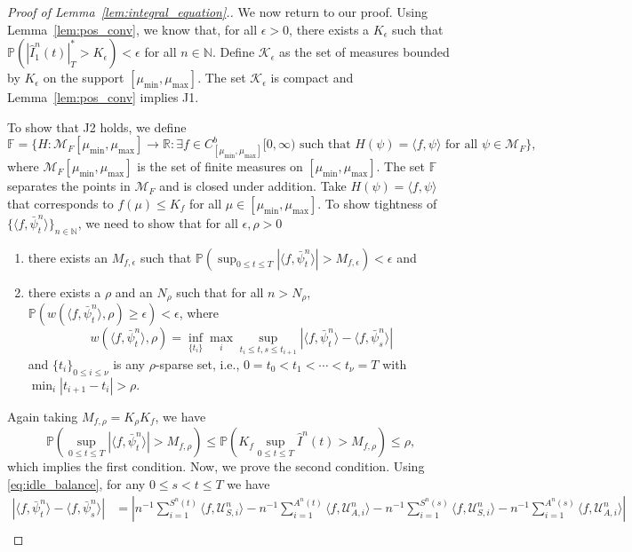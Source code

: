 \documentclass[a4paper,11pt,twoside]{article}
\numberwithin{equation}{section}
\numberwithin{figure}{section}
\theoremstyle{plain}
\newcommand{\cK}{\mathcal{K}}
\newcommand{\cM}{\mathcal{M}}
\newcommand{\cU}{\mathcal{U}}
\newcommand{\FF}{\mathbb{F}}
\newcommand{\NN}{\mathbb{N}}
\newcommand{\PP}{\mathbb{P}}
\newcommand{\RR}{\mathbb{R}}
\newcommand{\1}{\mathbbm{1}}
\begin{document}
\begin{proof}[Proof of Lemma~\ref{lem:integral_equation}.]
   We now return to our proof. Using Lemma~\ref{lem:pos_conv}, we know that, for all $\epsilon>0$, there exists a $K_\epsilon$ such that 
   $\PP(|\hat{I}_1^n(t)|_T^*>K_\epsilon)<\epsilon$ for all $n\in \NN$. Define $\cK_\epsilon$ as the set of measures bounded by $K_\epsilon$ on the support $[\mu_{\min}, \mu_{\max}]$. The set $\cK_\epsilon$ is compact and Lemma~\ref{lem:pos_conv} implies J1. 
   
   To show that J2 holds, we define $$\FF=\{H:\cM_F[\mu_{\min}, \mu_{\max}]\to \RR:\exists f\in C_{[\mu_{\min},\mu_{\max}]}^b[0,\infty) \mbox{ such that } H(\psi)=\langle f, \psi\rangle \mbox{ for all }\psi\in\cM_F\}, $$
   where $\cM_F[\mu_{\min}, \mu_{\max}]$ is the set of finite measures on $[\mu_{\min}, \mu_{\max}]$. The set $\FF$ separates the points in $\cM_F$ and is closed under addition. Take $H(\psi)=\langle f, \psi \rangle$ that corresponds to $f(\mu)\leq K_f$ for all $\mu\in [\mu_{\min}, \mu_{\max}]$. To show tightness of $\{\langle f,\bar{\psi}_t^n\rangle \}_{n\in \NN}$, we need to show that for all $\epsilon,\rho>0$
   \begin{enumerate}
   \item there exists an $M_{f,\epsilon}$ such that $\PP\left(\sup_{0\leq t\leq T}|\langle f,\bar{\psi}_t^n\rangle|>M_{f,\epsilon}\right)<\epsilon$ and 
   \item there exists a $\rho$ and an $N_\rho$ such that for all $n>N_\rho$, $ \PP\left(w(\langle f, \bar{\psi}_t^n \rangle, \rho)\geq \epsilon\right)<\epsilon$, where $$w(\langle f, \bar{\psi}_t^n\rangle, \rho)=\inf_{\{t_i\}}\max_{i}\sup_{t_i\leq t,s\leq t_{i+1}}|\langle f, \bar{\psi}_t^n \rangle-\langle f, \bar{\psi}_s^n \rangle|$$ and $\{t_i\}_{0\leq i \leq \nu}$ is any $\rho$-sparse set, i.e., $0=t_0<t_1<\cdots<t_\nu=T$ with $\min_{i}|t_{i+1}-t_i|>\rho$. 
   \end{enumerate} 
   Again taking $M_{f,\rho}=K_\rho K_f$, we have \[\PP\left(\sup_{0\leq t\leq T}|\langle f,\bar{\psi}_t^n\rangle|>M_{f,\rho}\right)\leq \PP\left(K_f\sup_{0\leq t\leq T}\hat{I}^{n}(t)>M_{f,\rho}\right)\leq \rho,\]
   which implies the first condition. Now, we prove the second condition. Using \eqref{eq:idle_balance}, for any $0\leq s< t\leq T$ we have
   \begin{align}
       \nonumber|\langle f, \bar{\psi}^{n}_t\rangle - \langle f, \bar{\psi}^{n}_s\rangle| &= \left |n^{-1}\sum_{i=1}^{S^n(t)} \langle f, \cU_{S,i}^n \rangle -n^{-1}\sum_{i=1}^{A^n(t)}\langle f, \cU_{A,i}^n \rangle - n^{-1}\sum_{i=1}^{S^n(s)} \langle f, \cU_{S,i}^n \rangle -n^{-1}\sum_{i=1}^{A^n(s)}\langle f, \cU_{A,i}^n \rangle\right| \\

\end{align}
\end{proof}
\end{document}
